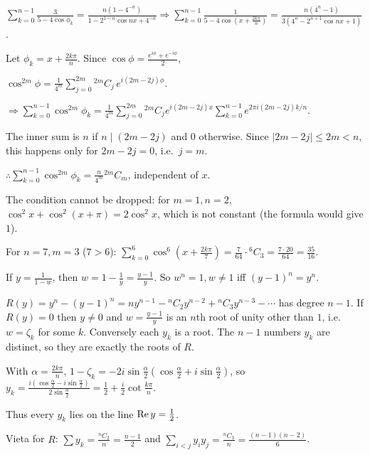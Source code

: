   $\displaystyle\sum_{k = 0}^{n - 1}\frac{3}{5 - 4\cos\phi_k} = \frac{n(1 - 4^{-n})}{1 - 2^{1 - n}\cos nx +
    4^{-n}}\Rightarrow\sum_{k = 0}^{n - 1}\frac{1}{5 - 4\cos\left(x + \frac{2k\pi}{n}\right)} = \frac{n(4^n -
    1)}{3\left(4^n - 2^{n + 1}\cos nx + 1\right)}$.
\item Let $\phi_k = x + \frac{2k\pi}{n}$. Since $\cos\phi = \frac{e^{i\phi} + e^{-i\phi}}{2}$,

  $\cos^{2m}\phi = \frac{1}{4^m}\displaystyle\sum_{j = 0}^{2m}{}^{2m}C_j\,e^{i(2m - 2j)\phi}$.

  $\Rightarrow\displaystyle\sum_{k = 0}^{n - 1}\cos^{2m}\phi_k = \frac{1}{4^m}\sum_{j = 0}^{2m}{}^{2m}C_je^{i(2m -
    2j)x}\sum_{k = 0}^{n - 1}e^{2\pi i(2m - 2j)k/n}$.

  The inner sum is $n$ if $n\mid(2m - 2j)$ and $0$ otherwise. Since $|2m - 2j|\leq 2m < n$, this happens only
  for $2m - 2j = 0$, i.e.\ $j = m$.

  $\therefore\displaystyle\sum_{k = 0}^{n - 1}\cos^{2m}\phi_k = \frac{n}{4^m}{}^{2m}C_m$, independent of $x$.

  The condition cannot be dropped: for $m = 1, n = 2$, $\cos^2x + \cos^2(x + \pi) = 2\cos^2x$, which is not
  constant (the formula would give $1$).

  For $n = 7, m = 3$ ($7 > 6$): $\displaystyle\sum_{k = 0}^6\cos^6\left(x + \frac{2k\pi}{7}\right) =
  \frac{7}{64}\cdot{}^6C_3 = \frac{7\cdot 20}{64} = \frac{35}{16}$.
\item If $y = \frac{1}{1 - w}$, then $w = 1 - \frac{1}{y} = \frac{y - 1}{y}$. So $w^n = 1, w\neq 1$ iff
  $(y - 1)^n = y^n$.

  $R(y) = y^n - (y - 1)^n = ny^{n - 1} - {}^nC_2y^{n - 2} + {}^nC_3y^{n - 3} - \cdots$ has degree $n - 1$. If
  $R(y) = 0$ then $y\neq 0$ and $w = \frac{y - 1}{y}$ is an $n$th root of unity other than $1$, i.e.\ $w =
  \zeta_k$ for some $k$. Conversely each $y_k$ is a root. The $n - 1$ numbers $y_k$ are distinct, so they are
  exactly the roots of $R$.

  With $\alpha = \frac{2k\pi}{n}$, $1 - \zeta_k = -2i\sin\frac{\alpha}{2}\left(\cos\frac{\alpha}{2} +
  i\sin\frac{\alpha}{2}\right)$, so $y_k = \frac{i\left(\cos\frac{\alpha}{2} -
    i\sin\frac{\alpha}{2}\right)}{2\sin\frac{\alpha}{2}} = \frac{1}{2} + \frac{i}{2}\cot\frac{k\pi}{n}$.

  Thus every $y_k$ lies on the line ${\rm Re}\,y = \frac{1}{2}$.

  Vieta for $R$: $\displaystyle\sum y_k = \frac{{}^nC_2}{n} = \frac{n - 1}{2}$ and $\displaystyle\sum_{i <
    j}y_iy_j = \frac{{}^nC_3}{n} = \frac{(n - 1)(n - 2)}{6}$.

